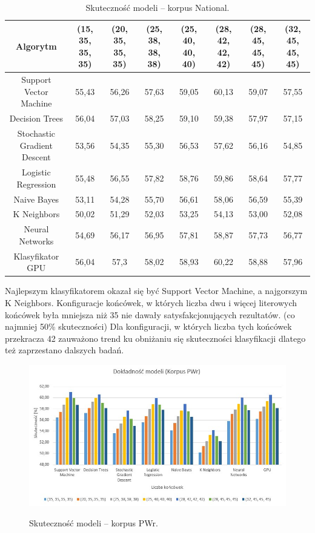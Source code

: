 \begin{landscape}
	\begin{table}[!htbp]
		\centering
		\caption{Skuteczność modeli -- korpus National.}
		\begin{tabular}{cccccccc}
			\toprule
			\textbf{Algorytm} & \textbf{(15, 35, 35, 35)} & \textbf{(20, 35, 35, 35)} & \textbf{(25, 38, 38, 38)} & \textbf{(25, 40, 40, 40)} & \textbf{(28, 42, 42, 42)} & \textbf{(28, 45, 45, 45)} & \textbf{(32, 45, 45, 45)} \\
			\midrule
			Support Vector Machine & 55,43 & 56,26 & 57,63 & 59,05 & 60,13 & 59,07 & 57,55 \\
			Decision Trees & 56,04 & 57,03 & 58,25 & 59,10 & 59,38 & 57,97 & 57,15 \\
			Stochastic Gradient Descent & 53,56 & 54,35 & 55,30 & 56,53 & 57,62 & 56,16 & 54,85 \\
			Logistic Regression & 55,48 & 56,55 & 57,82 & 58,76 & 59,86 & 58,64 & 57,77 \\
			Naive Bayes & 53,11 & 54,28 & 55,70 & 56,61 & 58,06 & 56,59 & 55,39 \\
			K Neighbors & 50,02 & 51,29 & 52,03 & 53,25 & 54,13 & 53,00 & 52,08 \\
			Neural Networks & 54,69 & 56,17 & 56,95 & 57,81 & 58,87 & 57,73 & 56,77 \\
			Klasyfikator GPU & 56,04 & 57,3 & 58,02 & 58,93 & 60,22 & 58,88 & 57,96 \\
			\bottomrule
		\end{tabular}
	\end{table}
\end{landscape}

Najlepszym klasyfikatorem okazał się być Support Vector Machine, a najgorszym K Neighbors. Konfiguracje końcówek, w których liczba dwu i więcej literowych końcówek była mniejsza niż 35 nie dawały satysfakcjonujących rezultatów. (co najmniej 50\% skuteczności) Dla konfiguracji, w których liczba tych końcówek przekracza 42 zauważono trend ku obniżaniu się skuteczności klasyfikacji dlatego też zaprzestano dalszych badań.

\begin{figure}[!htbp]
	\centering
	\includegraphics[width=\linewidth]{charts/korpuspwrwykres}
	\label{Rysunek}
	\caption{Skuteczność modeli -- korpus PWr.}
\end{figure}

